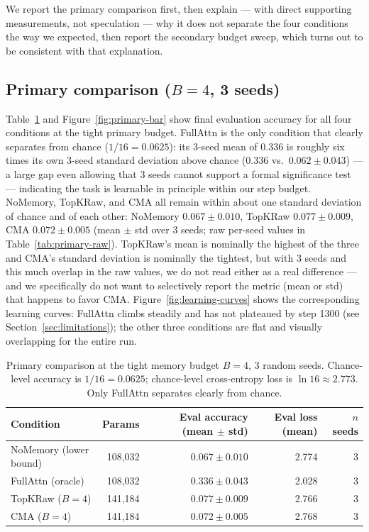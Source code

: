 \documentclass[11pt]{article}
\begin{document}
We report the primary comparison first, then explain --- with direct supporting measurements,
not speculation --- why it does not separate the four conditions the way we expected, then report
the secondary budget sweep, which turns out to be consistent with that explanation.

\subsection{Primary comparison ($B{=}4$, 3 seeds)}
\label{sec:results-primary}

Table~\ref{tab:primary} and Figure~\ref{fig:primary-bar} show final evaluation accuracy for all
four conditions at the tight primary budget. FullAttn is the only condition that clearly
separates from chance ($1/16 = 0.0625$): its 3-seed mean of $0.336$ is roughly six times its own
3-seed standard deviation above chance ($0.336$ vs.\ $0.062 \pm 0.043$) --- a large gap even
allowing that 3 seeds cannot support a formal significance test --- indicating the task is
learnable in principle within our step budget. NoMemory, TopKRaw, and CMA all remain within about one standard deviation
of chance and of each other: NoMemory $0.067 \pm 0.010$, TopKRaw $0.077 \pm 0.009$, CMA
$0.072 \pm 0.005$ (mean $\pm$ std over 3 seeds; raw per-seed values in
Table~\ref{tab:primary-raw}). TopKRaw's mean is nominally the highest of the three and CMA's
standard deviation is nominally the tightest, but with 3 seeds and this much overlap in the raw
values, we do not read either as a real difference --- and we specifically do not want to
selectively report the metric (mean or std) that happens to favor CMA. Figure~\ref{fig:learning-curves}
shows the corresponding learning curves: FullAttn climbs steadily and has not plateaued by step
1300 (see Section~\ref{sec:limitations}); the other three conditions are flat and visually
overlapping for the entire run.

\begin{table}[H]
\centering
\small
\begin{tabular}{lrrrr}
\toprule
Condition & Params & Eval accuracy (mean $\pm$ std) & Eval loss (mean) & $n$ seeds \\
\midrule
NoMemory (lower bound) & 108{,}032 & $0.067 \pm 0.010$ & 2.774 & 3 \\
FullAttn (oracle) & 108{,}032 & $0.336 \pm 0.043$ & 2.028 & 3 \\
TopKRaw ($B{=}4$) & 141{,}184 & $0.077 \pm 0.009$ & 2.766 & 3 \\
CMA ($B{=}4$) & 141{,}184 & $0.072 \pm 0.005$ & 2.768 & 3 \\
\bottomrule
\end{tabular}
\caption{Primary comparison at the tight memory budget $B{=}4$, 3 random seeds. Chance-level
accuracy is $1/16=0.0625$; chance-level cross-entropy loss is $\ln 16 \approx 2.773$. Only
FullAttn separates clearly from chance.}
\label{tab:primary}
\end{table}
\end{document}
